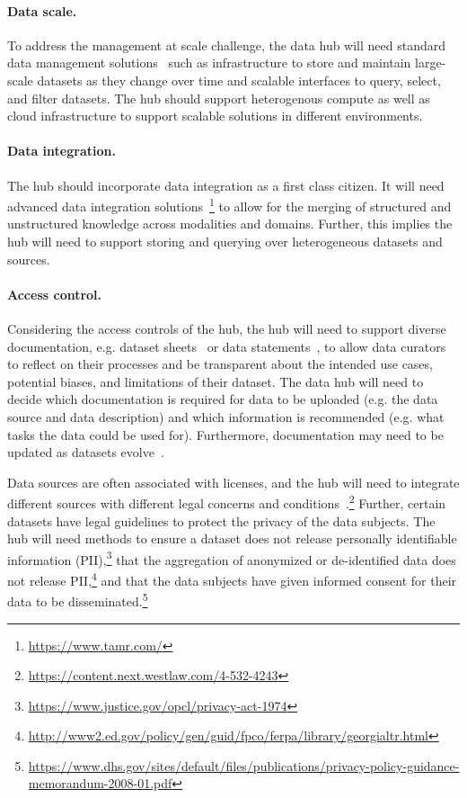 \paragraph{Data scale.} To address the management at scale challenge, the data hub will need standard data management solutions~\citep{armbrust2009above} such as infrastructure to store and maintain large-scale datasets as they change over time and scalable interfaces to query, select, and filter datasets. The hub should support heterogenous compute as well as cloud infrastructure to support scalable solutions in different environments. 

\paragraph{Data integration.} The hub should incorporate data integration as a first class citizen. It will need advanced data integration solutions~\citep{Stonebraker2018dataintegration, abiteboul1997semistructureddata, dong2020multi, rekatsinas2017holoclean}\footnote{\url{https://www.tamr.com/}} to allow for the merging of structured and unstructured knowledge across modalities and domains. Further, this implies the hub will need to support storing and querying over heterogeneous datasets and sources.

\paragraph{Access control.} Considering the access controls of the hub, the hub will need to support diverse documentation, e.g. dataset sheets~\citep{gebru2018datasheets} or data statements~\citep{bender2018data}, to allow data curators to reflect on their processes and be transparent about the intended use cases, potential biases, and limitations of their dataset. The data hub will need to decide which documentation is required for data to be uploaded (e.g. the data source and data description) and which information is recommended (e.g. what tasks the data could be used for). Furthermore, documentation may need to be updated as datasets evolve~\citep{goel2021robustnessgym}.

Data sources are often associated with licenses, and the hub will need to integrate different sources with different legal concerns and conditions~\citep{masur2018datalicensing}.\footnote{\url{https://content.next.westlaw.com/4-532-4243}} Further, certain datasets have legal guidelines to protect the privacy of the data subjects. The hub will need methods to ensure a dataset does not release personally identifiable information (PII),\footnote{\url{https://www.justice.gov/opcl/privacy-act-1974}} that the aggregation of anonymized or de-identified data does not release PII,\footnote{\url{http://www2.ed.gov/policy/gen/guid/fpco/ferpa/library/georgialtr.html}} and that the data subjects have given informed consent for their data to be disseminated.\footnote{\url{https://www.dhs.gov/sites/default/files/publications/privacy-policy-guidance-memorandum-2008-01.pdf}}

